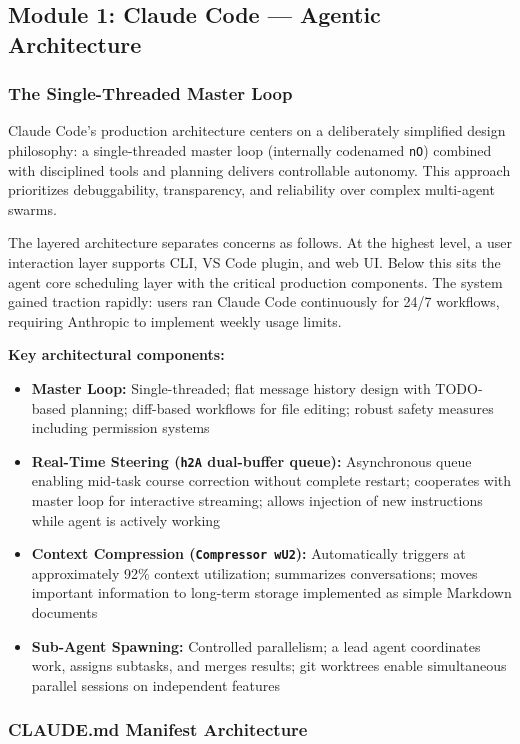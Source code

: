 \documentclass[11pt,letterpaper]{article}
\begin{document}
\subsection{Module 1: Claude Code --- Agentic Architecture}

\subsubsection{The Single-Threaded Master Loop}

Claude Code's production architecture centers on a deliberately simplified design philosophy: a single-threaded master loop (internally codenamed \texttt{nO}) combined with disciplined tools and planning delivers controllable autonomy. This approach prioritizes debuggability, transparency, and reliability over complex multi-agent swarms.

The layered architecture separates concerns as follows. At the highest level, a user interaction layer supports CLI, VS Code plugin, and web UI. Below this sits the agent core scheduling layer with the critical production components. The system gained traction rapidly: users ran Claude Code continuously for 24/7 workflows, requiring Anthropic to implement weekly usage limits.

\textbf{Key architectural components:}
\begin{itemize}[leftmargin=1.5em]
  \item \textbf{Master Loop:} Single-threaded; flat message history design with TODO-based planning; diff-based workflows for file editing; robust safety measures including permission systems
  \item \textbf{Real-Time Steering (\texttt{h2A} dual-buffer queue):} Asynchronous queue enabling mid-task course correction without complete restart; cooperates with master loop for interactive streaming; allows injection of new instructions while agent is actively working
  \item \textbf{Context Compression (\texttt{Compressor wU2}):} Automatically triggers at approximately 92\% context utilization; summarizes conversations; moves important information to long-term storage implemented as simple Markdown documents
  \item \textbf{Sub-Agent Spawning:} Controlled parallelism; a lead agent coordinates work, assigns subtasks, and merges results; git worktrees enable simultaneous parallel sessions on independent features
\end{itemize}

\subsubsection{CLAUDE.md Manifest Architecture}
\end{document}
